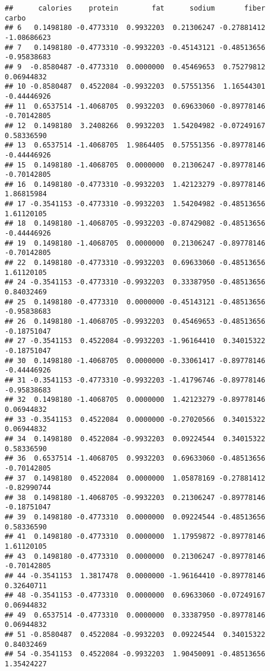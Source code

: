 \documentclass[
]{article}
\begin{document}
\begin{verbatim}
##      calories    protein        fat      sodium       fiber       carbo
## 6   0.1498180 -0.4773310  0.9932203  0.21306247 -0.27881412 -1.08686623
## 7   0.1498180 -0.4773310 -0.9932203 -0.45143121 -0.48513656 -0.95838683
## 9  -0.8580487 -0.4773310  0.0000000  0.45469653  0.75279812  0.06944832
## 10 -0.8580487  0.4522084 -0.9932203  0.57551356  1.16544301 -0.44446926
## 11  0.6537514 -1.4068705  0.9932203  0.69633060 -0.89778146 -0.70142805
## 12  0.1498180  3.2408266  0.9932203  1.54204982 -0.07249167  0.58336590
## 13  0.6537514 -1.4068705  1.9864405  0.57551356 -0.89778146 -0.44446926
## 15  0.1498180 -1.4068705  0.0000000  0.21306247 -0.89778146 -0.70142805
## 16  0.1498180 -0.4773310 -0.9932203  1.42123279 -0.89778146  1.86815984
## 17 -0.3541153 -0.4773310 -0.9932203  1.54204982 -0.48513656  1.61120105
## 18  0.1498180 -1.4068705 -0.9932203 -0.87429082 -0.48513656 -0.44446926
## 19  0.1498180 -1.4068705  0.0000000  0.21306247 -0.89778146 -0.70142805
## 22  0.1498180 -0.4773310 -0.9932203  0.69633060 -0.48513656  1.61120105
## 24 -0.3541153 -0.4773310 -0.9932203  0.33387950 -0.48513656  0.84032469
## 25  0.1498180 -0.4773310  0.0000000 -0.45143121 -0.48513656 -0.95838683
## 26  0.1498180 -1.4068705 -0.9932203  0.45469653 -0.48513656 -0.18751047
## 27 -0.3541153  0.4522084 -0.9932203 -1.96164410  0.34015322 -0.18751047
## 30  0.1498180 -1.4068705  0.0000000 -0.33061417 -0.89778146 -0.44446926
## 31 -0.3541153 -0.4773310 -0.9932203 -1.41796746 -0.89778146 -0.95838683
## 32  0.1498180 -1.4068705  0.0000000  1.42123279 -0.89778146  0.06944832
## 33 -0.3541153  0.4522084  0.0000000 -0.27020566  0.34015322  0.06944832
## 34  0.1498180  0.4522084 -0.9932203  0.09224544  0.34015322  0.58336590
## 36  0.6537514 -1.4068705  0.9932203  0.69633060 -0.48513656 -0.70142805
## 37  0.1498180  0.4522084  0.0000000  1.05878169 -0.27881412 -0.82990744
## 38  0.1498180 -1.4068705 -0.9932203  0.21306247 -0.89778146 -0.18751047
## 39  0.1498180 -0.4773310  0.0000000  0.09224544 -0.48513656  0.58336590
## 41  0.1498180 -0.4773310  0.0000000  1.17959872 -0.89778146  1.61120105
## 43  0.1498180 -0.4773310  0.0000000  0.21306247 -0.89778146 -0.70142805
## 44 -0.3541153  1.3817478  0.0000000 -1.96164410 -0.89778146  0.32640711
## 48 -0.3541153 -0.4773310  0.0000000  0.69633060 -0.07249167  0.06944832
## 49  0.6537514 -0.4773310  0.0000000  0.33387950 -0.89778146  0.06944832
## 51 -0.8580487  0.4522084 -0.9932203  0.09224544  0.34015322  0.84032469
## 54 -0.3541153  0.4522084 -0.9932203  1.90450091 -0.48513656  1.35424227

\end{verbatim}
\end{document}
